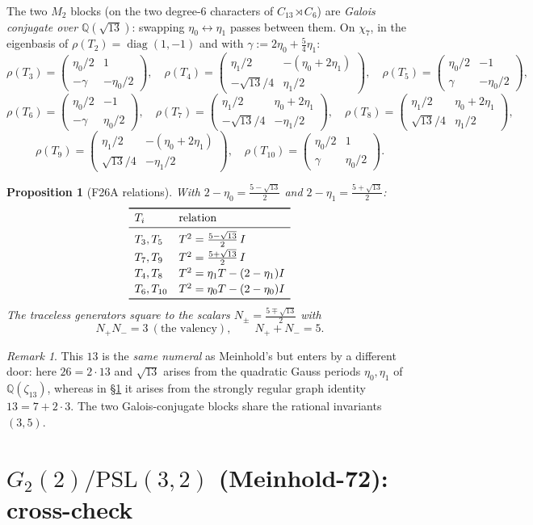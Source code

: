 \documentclass[11pt]{article}
\newtheorem{proposition}[theorem]{Proposition}
\theoremstyle{remark}
\newtheorem{remark}[theorem]{Remark}
\newcommand{\Q}{\mathbb{Q}}
\newcommand{\T}[1]{T_{#1}}
\newcommand{\rh}[1]{\rho(T_{#1})}
\newcommand{\mat}[4]{\begin{pmatrix} #1 & #2 \\ #3 & #4 \end{pmatrix}}
\begin{document}
The two $M_2$ blocks (on the two degree-6 characters of
$C_{13}\rtimes C_6$) are \emph{Galois conjugate over} $\Q(\sqrt{13})$:
swapping $\eta_0\leftrightarrow\eta_1$ passes between them. On $\chi_7$,
in the eigenbasis of $\rho(\T2)=\operatorname{diag}(1,-1)$ and with
$\gamma := 2\eta_0+\tfrac54\eta_1$:
\[
\rh3 = \mat{\eta_0/2}{1}{-\gamma}{-\eta_0/2},\quad
\rh4 = \mat{\eta_1/2}{-(\eta_0+2\eta_1)}{-\sqrt{13}/4}{\eta_1/2},\quad
\rh5 = \mat{\eta_0/2}{-1}{\gamma}{-\eta_0/2},
\]
\[
\rh6 = \mat{\eta_0/2}{-1}{-\gamma}{\eta_0/2},\quad
\rh7 = \mat{\eta_1/2}{\eta_0+2\eta_1}{-\sqrt{13}/4}{-\eta_1/2},\quad
\rh8 = \mat{\eta_1/2}{\eta_0+2\eta_1}{\sqrt{13}/4}{\eta_1/2},
\]
\[
\rh9 = \mat{\eta_1/2}{-(\eta_0+2\eta_1)}{\sqrt{13}/4}{-\eta_1/2},\quad
\rh{10} = \mat{\eta_0/2}{1}{\gamma}{\eta_0/2}.
\]

\begin{proposition}[F26A relations]\label{prop:f26a}
With $2-\eta_0=\frac{5-\sqrt{13}}{2}$ and $2-\eta_1=\frac{5+\sqrt{13}}{2}$:
\[
\begin{array}{ll}
\toprule
\T i & \text{relation}\\
\midrule
\T3,\T5 & T^2 = \tfrac{5-\sqrt{13}}{2}\, I\\[2pt]
\T7,\T9 & T^2 = \tfrac{5+\sqrt{13}}{2}\, I\\[2pt]
\T4,\T8 & T^2 = \eta_1 T - (2-\eta_1) I\\[2pt]
\T6,\T{10} & T^2 = \eta_0 T - (2-\eta_0) I\\
\bottomrule
\end{array}
\]
The traceless generators square to the scalars
$N_\pm = \frac{5\mp\sqrt{13}}{2}$ with
\[
N_+N_- = 3\ (\text{the valency}),\qquad N_+ + N_- = 5 .
\]
\end{proposition}

\begin{remark}
This $13$ is the \emph{same numeral} as Meinhold's but enters by a
different door: here $26 = 2\cdot 13$ and $\sqrt{13}$ arises from the
quadratic Gauss periods $\eta_0,\eta_1$ of $\Q(\zeta_{13})$, whereas in
\S\ref{sec:meinhold} it arises from the strongly regular graph identity
$13 = 7+2\cdot3$. The two Galois-conjugate blocks share the rational
invariants $(3,5)$.
\end{remark}

\section{$G_2(2)/\mathrm{PSL}(3,2)$ (Meinhold-72): cross-check}
\label{sec:meinhold}
\end{document}
